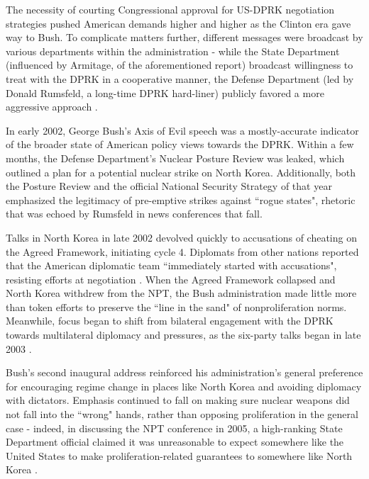 The necessity of courting Congressional approval for US-DPRK negotiation strategies pushed American demands higher and higher as the Clinton era gave way to Bush. To complicate matters further, different messages were broadcast by various departments within the administration - while the State Department (influenced by Armitage, of the aforementioned report) broadcast willingness to treat with the DPRK in a cooperative manner, the Defense Department (led by Donald Rumsfeld, a long-time DPRK hard-liner\cite{rumsfeld}) publicly favored a more aggressive approach \cite{harnisch}.

In early 2002, George Bush's Axis of Evil speech was a mostly-accurate indicator of the broader state of American policy views towards the DPRK. Within a few months, the Defense Department's Nuclear Posture Review was leaked, which outlined a plan for a potential nuclear strike on North Korea\cite{npreview}. Additionally, both the Posture Review and the official National Security Strategy of that year emphasized the legitimacy of pre-emptive strikes against ``rogue states"\cite{bleiker}, rhetoric that was echoed by Rumsfeld in news conferences that fall\cite{harnisch}.

Talks in North Korea in late 2002 devolved quickly to accusations of cheating on the Agreed Framework, initiating cycle 4. Diplomats from other nations reported that the American diplomatic team ``immediately started with accusations", resisting efforts at negotiation \cite{bleiker}. When the Agreed Framework collapsed and North Korea withdrew from the NPT, the Bush administration made little more than token efforts to preserve the ``line in the sand" of nonproliferation norms\cite{huntley}. Meanwhile, focus began to shift from bilateral engagement with the DPRK towards multilateral diplomacy and pressures, as the six-party talks began in late 2003 \cite{crs13}.

Bush's second inaugural address reinforced his administration's general preference for encouraging regime change in places like North Korea and avoiding diplomacy with dictators. Emphasis continued to fall on making sure nuclear weapons did not fall into the ``wrong" hands, rather than opposing proliferation in the general case - indeed, in discussing the NPT conference in 2005, a high-ranking State Department official claimed it was unreasonable to expect somewhere like the United States to make proliferation-related guarantees to somewhere like North Korea \cite{huntley}.

